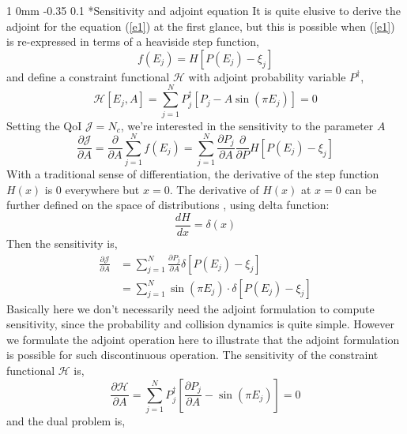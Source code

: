 \documentclass[11pt]{article}
\makeatletter
\renewcommand{\subsection}{\@startsection
{subsection}%
{1}%
{0mm}%
{-0.35\baselineskip}%
{0.1\baselineskip}%
{\normalfont\large\bfseries\color{brown}}}%
\def\Dpartial#1#2{ \frac{\partial #1}{\partial #2} }
\def\Dnorm#1#2{ \frac{d #1 }{ d #2} }
\newcommand{\cH}{\mathcal{H}}
\newcommand{\cJ}{\mathcal{J}}
\makeatother
\begin{document}
\subsection*{Sensitivity and adjoint equation}
It is quite elusive to derive the adjoint for the equation (\ref{e1}) at the first glance,
but this is possible when (\ref{e1}) is re-expressed in terms of a heaviside step function,
\begin{equation*}
f(E_j) = H\left[ P(E_j) - \xi_j \right]
\end{equation*}
and define a constraint functional $\cH$ with adjoint probability variable $P^{\dagger}$,
\begin{equation*}
\cH[E_j,A] = \sum_{j=1}^N P_j^{\dagger}\left[ P_j - A\sin\left( \pi E_j \right) \right] = 0
\end{equation*}
Setting the QoI $\cJ=N_c$, we're interested in the sensitivity to the parameter $A$
\begin{equation*}
\Dpartial{\cJ}{A} = \Dpartial{}{A}\sum_{j=1}^{N} f(E_j) = \sum_{j=1}^N \Dpartial{P_j}{A}\Dpartial{}{P}H\left[ P(E_j) - \xi_j \right]
\end{equation*}
With a traditional sense of differentiation, the derivative of the step function $H(x)$ is 0 everywhere but $x=0$.
The derivative of $H(x)$ at $x=0$ can be further defined on the space of distributions \cite{DIST2013}, using delta function:
\begin{equation*}
\Dnorm{H}{x} = \delta(x)
\end{equation*}
Then the sensitivity is,
\begin{equation}
\begin{split}
\Dpartial{\cJ}{A} &= \sum_{j=1}^N \Dpartial{P_j}{A}\delta\left[ P(E_j) - \xi_j \right]\\
&= \sum_{j=1}^N \sin\left( \pi E_j \right)\cdot\delta\left[ P(E_j) - \xi_j \right]
\label{e2}
\end{split}
\end{equation}
Basically here we don't necessarily need the adjoint formulation to compute sensitivity,
since the probability and collision dynamics is quite simple.
However we formulate the adjoint operation here to illustrate that the adjoint formulation is possible for such discontinuous operation.
The sensitivity of the constraint functional $\cH$ is,
\begin{equation*}
\Dpartial{\cH}{A} = \sum_{j=1}^N P_j^{\dagger}\left[ \Dpartial{P_j}{A} - \sin\left( \pi E_j \right) \right] = 0
\end{equation*}
and the dual problem is,
\end{document}
